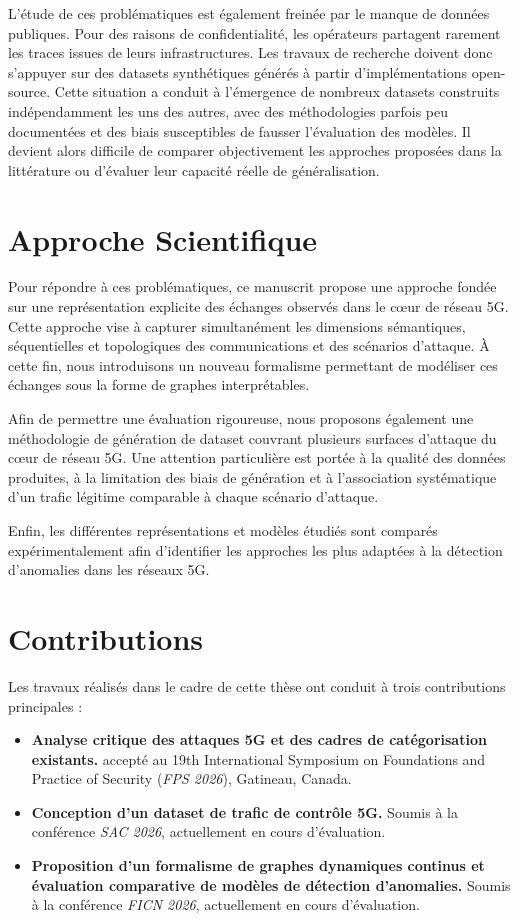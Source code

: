 \documentclass[a4paper,11pt,twoside]{StyleThese}
\begin{document}
L’étude de ces problématiques est également freinée par le manque de données publiques. Pour des raisons de confidentialité, les opérateurs partagent rarement les traces issues de leurs infrastructures. Les travaux de recherche doivent donc s’appuyer sur des datasets synthétiques générés à partir d’implémentations open-source. Cette situation a conduit à l’émergence de nombreux datasets construits indépendamment les uns des autres, avec des méthodologies parfois peu documentées et des biais susceptibles de fausser l’évaluation des modèles. Il devient alors difficile de comparer objectivement les approches proposées dans la littérature ou d’évaluer leur capacité réelle de généralisation.

\newpage

\section*{Approche Scientifique}
Pour répondre à ces problématiques, ce manuscrit propose une approche fondée sur une représentation explicite des échanges observés dans le cœur de réseau 5G. Cette approche vise à capturer simultanément les dimensions sémantiques, séquentielles et topologiques des communications et des scénarios d’attaque. À cette fin, nous introduisons un nouveau formalisme permettant de modéliser ces échanges sous la forme de graphes interprétables.

Afin de permettre une évaluation rigoureuse, nous proposons également une méthodologie de génération de dataset couvrant plusieurs surfaces d’attaque du cœur de réseau 5G. Une attention particulière est portée à la qualité des données produites, à la limitation des biais de génération et à l’association systématique d’un trafic légitime comparable à chaque scénario d’attaque.

Enfin, les différentes représentations et modèles étudiés sont comparés expérimentalement afin d’identifier les approches les plus adaptées à la détection d’anomalies dans les réseaux 5G.

\section*{Contributions}
Les travaux réalisés dans le cadre de cette thèse ont conduit à trois contributions principales :
\begin{itemize}
\item \textbf{Analyse critique des attaques 5G et des cadres de catégorisation existants.} accepté au 19th International Symposium on Foundations and Practice of Security (\emph{FPS 2026}), Gatineau, Canada.
\item \textbf{Conception d'un dataset de trafic de contrôle 5G.} Soumis à la conférence \emph{SAC 2026}, actuellement en cours d'évaluation.
\item \textbf{Proposition d'un formalisme de graphes dynamiques continus et évaluation comparative de modèles de détection d'anomalies.} Soumis à la conférence \emph{FICN 2026}, actuellement en cours d'évaluation.
\end{itemize}
\end{document}
